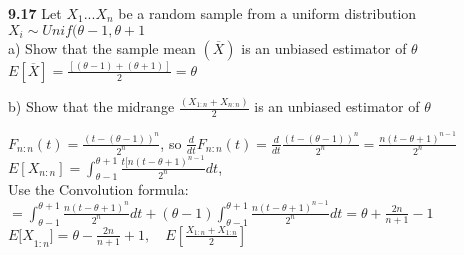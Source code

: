 
\noindent \textbf{9.17} Let $X_{1}...X_{n}$ be a random sample from a uniform distribution $X_{i} \sim Unif(\theta-1,\theta+1$\\

a) Show that the sample mean $(\overline{X})$ is an unbiased estimator of $\theta$\\

$E[\overline{X}]=\frac{[(\theta-1)+(\theta+1)]}{2}=\theta$

b) Show that the midrange  $\frac{(X_{1:n}+X_{n:n})}{2}$ is an unbiased estimator of $\theta$

$F_{n:n}(t)=\frac{(t-(\theta-1))^{n}}{2^{n}}$, so $\frac { d }{ dt } F_{ n:n }(t)=\frac { d }{ dt } \frac { (t-(\theta -1))^{ n } }{ 2^{ n } } =\frac { n(t-\theta +1)^{ n-1 } }{ 2^{ n } } $\\

$E[{ X }_{ n:n }]=\int _{ \theta -1 }^{ \theta +1 }{ \frac { t[n{ (t-\theta +1) }^{ n-1 } }{ { 2 }^{ n } }  } dt$,\\ Use the Convolution formula: $=\int _{ \theta -1 }^{ \theta +1 }{ \frac { n{ (t-\theta +1) }^{ n } }{ { 2 }^{ n } }  } dt+(\theta -1)\int _{ \theta -1 }^{ \theta +1 }{ \frac { n{ (t-\theta +1) }^{ n-1 } }{ { 2 }^{ n } }  } dt=\theta +\frac { 2n }{ n+1 } -1$\\

${ E[X }_{ 1:n }]=\theta -\frac { 2n }{ n+1 } +1,\quad E[\frac { { X }_{ 1:n }+{ X }_{ 1:n } }{ 2 } ]$ \\


